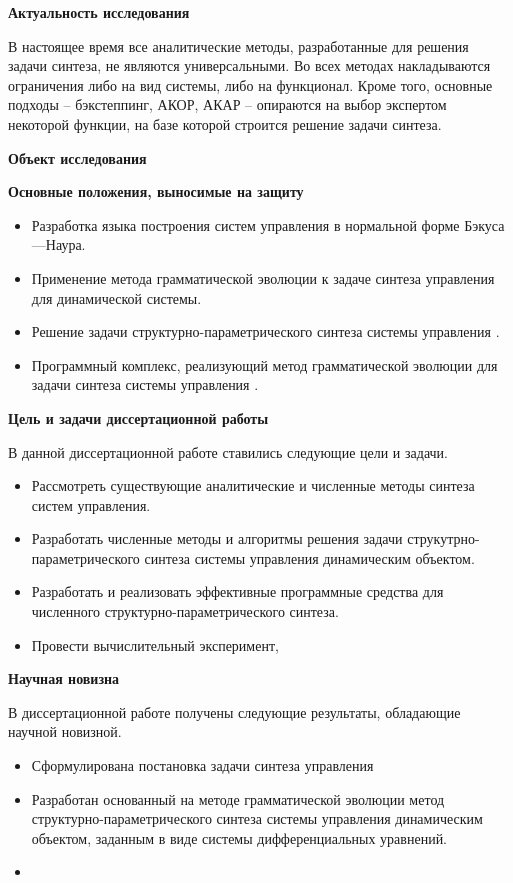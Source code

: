 \textbf{Актуальность исследования}

В настоящее время все аналитические методы, разработанные для решения задачи синтеза, не являются универсальными. Во всех методах накладываются ограничения либо на вид системы, либо на функционал. Кроме того, основные подходы -- бэкстеппинг, АКОР, АКАР -- опираются на выбор экспертом некоторой функции, на базе которой строится решение задачи синтеза.

\textbf{Объект исследования}


\textbf{Основные положения, выносимые на защиту}

    \begin{itemize}
        \item Разработка языка построения систем управления в нормальной форме Бэкуса---Наура.
        \item Применение метода грамматической эволюции к задаче синтеза управления для динамической системы.
        \item Решение задачи структурно-параметрического синтеза системы управления .
        \item Программный комплекс, реализующий метод грамматической эволюции для задачи синтеза системы управления .
    \end{itemize}

\textbf{Цель и задачи диссертационной работы}

В данной диссертационной работе ставились следующие цели и задачи.
    \begin{itemize}
        \item Рассмотреть существующие аналитические и численные методы синтеза систем управления.
        \item Разработать численные методы и алгоритмы решения задачи струкутрно-параметрического синтеза системы управления динамическим объектом.
        \item Разработать и реализовать эффективные программные средства для численного структурно-параметрического синтеза.
        \item Провести вычислительный эксперимент, 
    \end{itemize}

\textbf{Научная новизна}

В диссертационной работе получены следующие результаты, обладающие научной новизной.
    \begin{itemize}
        \item Сформулирована постановка задачи синтеза управления 
        \item Разработан основанный на методе грамматической эволюции метод структурно-параметрического синтеза системы управления динамическим объектом, заданным в виде системы дифференциальных уравнений. 
        \item 
    \end{itemize}

